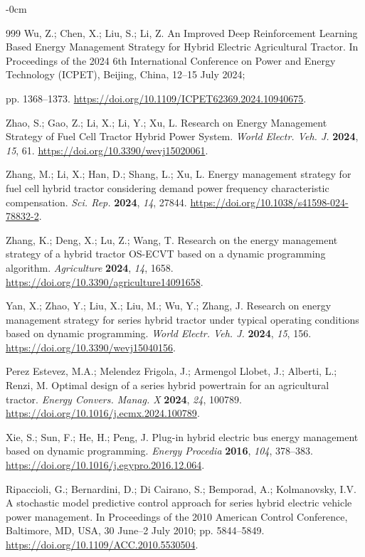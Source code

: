 \documentclass[energies,article,submit,moreauthors]{Definitions/mdpi}
\begin{document}
\begin{adjustwidth}{-\extralength}{0cm}
\begin{thebibliography}{999}
 Wu, Z.; Chen, X.; Liu, S.; Li, Z. An Improved Deep Reinforcement Learning Based Energy Management Strategy for Hybrid Electric Agricultural Tractor. In Proceedings of the {2024 6th International Conference on Power and Energy Technology (ICPET)}, Beijing, China, 12–15 July 2024;

 pp. 1368--1373. \url{https://doi.org/10.1109/ICPET62369.2024.10940675}.

 Zhao, S.; Gao, Z.; Li, X.; Li, Y.; Xu, L. Research on Energy Management Strategy of Fuel Cell Tractor Hybrid Power System. \emph{World Electr. Veh. J.} \textbf{2024}, \emph{15}, 61. \url{https://doi.org/10.3390/wevj15020061}.

 Zhang, M.; Li, X.; Han, D.; Shang, L.; Xu, L. Energy management strategy for fuel cell hybrid tractor considering demand power frequency characteristic compensation. \emph{Sci. Rep.} \textbf{2024}, \emph{14}, 27844. \url{https://doi.org/10.1038/s41598-024-78832-2}.

 Zhang, K.; Deng, X.; Lu, Z.; Wang, T. Research on the energy management strategy of a hybrid tractor OS-ECVT based on a dynamic programming algorithm. \emph{Agriculture} \textbf{2024}, \emph{14}, 1658. \url{https://doi.org/10.3390/agriculture14091658}.

 Yan, X.; Zhao, Y.; Liu, X.; Liu, M.; Wu, Y.; Zhang, J. Research on energy management strategy for series hybrid tractor under typical operating conditions based on dynamic programming. \emph{World Electr. Veh. J.} \textbf{2024}, \emph{15}, 156. \url{https://doi.org/10.3390/wevj15040156}.

 Perez Estevez, M.A.; Melendez Frigola, J.; Armengol Llobet, J.; Alberti, L.; Renzi, M. Optimal design of a series hybrid powertrain for an agricultural tractor. \emph{Energy Convers. Manag. X} \textbf{2024}, \emph{24}, 100789. \url{https://doi.org/10.1016/j.ecmx.2024.100789}.

 Xie, S.; Sun, F.; He, H.; Peng, J. Plug-in hybrid electric bus energy management based on dynamic programming. \emph{Energy Procedia} \textbf{2016}, \emph{104}, 378--383. \url{https://doi.org/10.1016/j.egypro.2016.12.064}.

 Ripaccioli, G.; Bernardini, D.; Di Cairano, S.; Bemporad, A.; Kolmanovsky, I.V. A stochastic model predictive control approach for series hybrid electric vehicle power management. In Proceedings of the 2010 American Control Conference, Baltimore, MD, USA, 30 June--2 July 2010; pp. 5844--5849. \url{https://doi.org/10.1109/ACC.2010.5530504}.



\end{thebibliography}
\end{adjustwidth}
\end{document}

